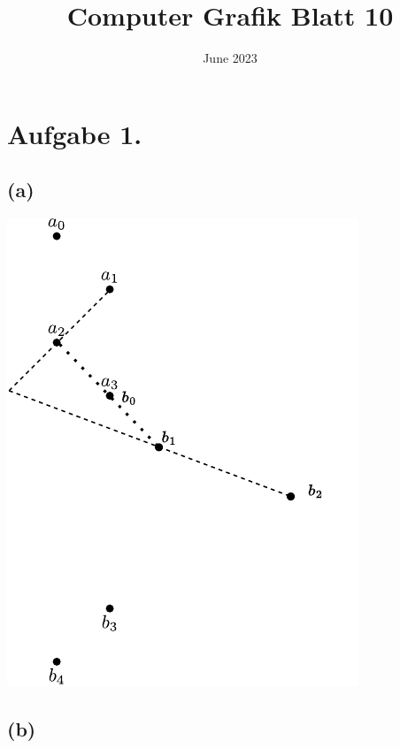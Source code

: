 \documentclass{article}
\title{Computer Grafik Blatt 10}
\date{June 2023}
\begin{document}
\maketitle

\section*{Aufgabe 1.}

\subsection*{(a)}
\includegraphics[width=\textwidth]{aufgabe1a.pdf}



\subsection*{(b)}
\end{document}
